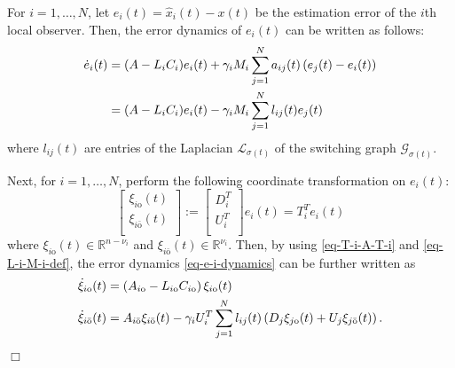 \documentclass[twocolumn]{autart}
\newcommand{\RR}{\mathbb{R}}
\newenvironment{Proof}{\noindent{\em Proof:\/}}{\hfill $\Box$\par}
\begin{document}
\begin{Proof}
For $i=1,\ldots,N$, let $e_{i}(t)=\hat{x}_{i}(t)-x(t)$ be the estimation error of the $i$th local observer.
Then, the error dynamics of $e_{i}(t)$ can be written as follows:
\begin{align}\label{eq-e-i-dynamics}
   \dot{e}_{i}(t)&=(A-L_{i}C_{i})e_{i}(t) + \gamma_{i} M_{i}\sum_{j=1}^{N}a_{ij}(t)\left(e_{j}(t)-e_{i}(t)\right) \notag\\
    &=(A-L_{i}C_{i})e_{i}(t) - \gamma_{i} M_{i}\sum_{j=1}^{N}l_{ij}(t)e_{j}(t)
\end{align}
where $l_{ij}(t)$ are entries of the Laplacian $\mathcal{L}_{\sigma(t)}$ of the switching graph $\mathcal{G}_{\sigma(t)}$.


Next, for $i=1,\ldots,N$, perform the following coordinate transformation on $e_{i}(t)$:
\begin{equation*}
    \left[
      \begin{array}{c}
       \xi_{i\text{o}}(t)  \\
       \xi_{i\bar{\text{o}}}(t) \\
      \end{array}
    \right]:= \left[
                \begin{array}{c}
                  D_{i}^{T} \\
                  U_{i}^{T} \\
                \end{array}
              \right]e_{i}(t)=T_{i}^{T}e_{i}(t)
\end{equation*}
where $\xi_{i\text{o}}(t) \in \RR^{n-\nu_{i}}$ and $\xi_{i\bar{\text{o}}}(t) \in \RR^{\nu_{i}}$.
Then, by using \eqref{eq-T-i-A-T-i} and \eqref{eq-L-i-M-i-def},
the error dynamics \eqref{eq-e-i-dynamics} can be further written as
\begin{align}\label{eq-xi-i-dynamics}
    \dot{\xi}_{i\text{o}}(t)&=\left(A_{i\text{o}}-L_{i\text{o}}C_{i\text{o}}\right)\xi_{i\text{o}}(t) \notag\\
    \dot{\xi}_{i\bar{\text{o}}}(t)&= A_{i\bar{\text{o}}}\xi_{i\bar{\text{o}}}(t)
    - \gamma_{i} U_{i}^{T}\sum_{j=1}^{N}l_{ij}(t)\left(D_{j} \xi_{j\text{o}}(t)+U_{j}\xi_{j\bar{\text{o}}}(t)\right).
\end{align}



\end{Proof}
\end{document}
